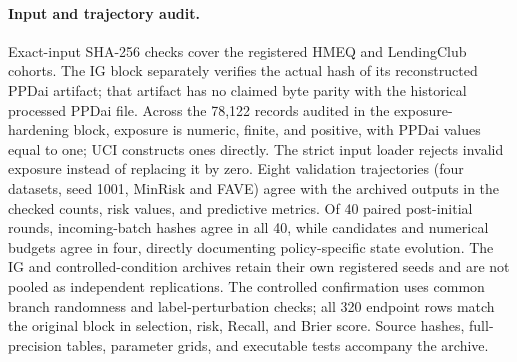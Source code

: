 \paragraph{Input and trajectory audit.}
Exact-input SHA-256 checks cover the registered HMEQ and LendingClub cohorts. The IG block separately verifies the actual hash of its reconstructed PPDai artifact; that artifact has no claimed byte parity with the historical processed PPDai file. Across the 78,122 records audited in the exposure-hardening block, exposure is numeric, finite, and positive, with PPDai values equal to one; UCI constructs ones directly. The strict input loader rejects invalid exposure instead of replacing it by zero. Eight validation trajectories (four datasets, seed 1001, MinRisk and FAVE) agree with the archived outputs in the checked counts, risk values, and predictive metrics. Of 40 paired post-initial rounds, incoming-batch hashes agree in all 40, while candidates and numerical budgets agree in four, directly documenting policy-specific state evolution.
The IG and controlled-condition archives retain their own registered seeds and are not pooled as independent replications. The controlled confirmation uses common branch randomness and label-perturbation checks; all 320 endpoint rows match the original block in selection, risk, Recall, and Brier score. Source hashes, full-precision tables, parameter grids, and executable tests accompany the archive.

